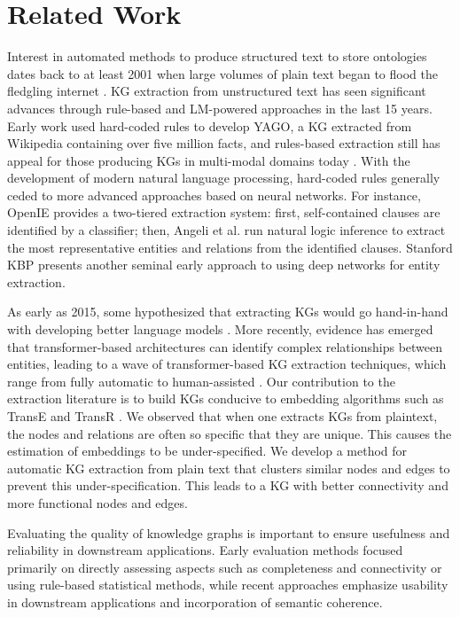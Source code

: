 \section{Related Work}
Interest in automated methods to produce structured text to store ontologies dates back to at least 2001 when large volumes of plain text began to flood the fledgling internet \citep{early_ontologies}. KG extraction from unstructured text has seen significant advances through rule-based and LM-powered approaches in the last 15 years.  Early work \citep{yago} used hard-coded rules to develop YAGO, a KG extracted from Wikipedia containing over five million facts, and rules-based extraction still has appeal for those producing KGs in multi-modal domains today \citep{Norabid2022RulebasedTE, rules_music}.  With the development of modern natural language processing, hard-coded rules generally ceded to more advanced approaches based on neural networks.  For instance, OpenIE \citep{angeli-etal-2015-leveraging} provides a two-tiered extraction system: first, self-contained clauses are identified by a classifier; then, Angeli et al. run natural logic inference to extract the most representative entities and relations from the identified clauses.  Stanford KBP \citep{Angeli2013Stanfords2K} presents another seminal early approach to using deep networks for entity extraction.  

As early as 2015, some hypothesized that extracting KGs would go hand-in-hand with developing better language models \citep{Domeniconi}.  More recently, evidence has emerged that transformer-based architectures can identify complex relationships between entities, leading to a wave of transformer-based KG extraction techniques, which range from fully automatic \citep{qiao2022joint, Arsenyan2023LargeLM, Zhang2024ExtractDC} to human-assisted \citep{Kommineni2024FromHE}.  Our contribution to the extraction literature is to build KGs conducive to embedding algorithms such as TransE and TransR \citep{TransE, TransR}.  We observed that when one extracts KGs from plaintext, the nodes and relations are often so specific that they are unique.  This causes the estimation of embeddings to be under-specified.  We develop a method for automatic KG extraction from plain text that clusters similar nodes and edges to prevent this under-specification. This leads to a KG with better connectivity and more functional nodes and edges. 

Evaluating the quality of knowledge graphs is important to ensure usefulness and reliability in downstream applications. Early evaluation methods focused primarily on directly assessing aspects such as completeness and connectivity or using rule-based statistical methods, while recent approaches emphasize usability in downstream applications and incorporation of semantic coherence\citep{xue2023knowledge}. 

